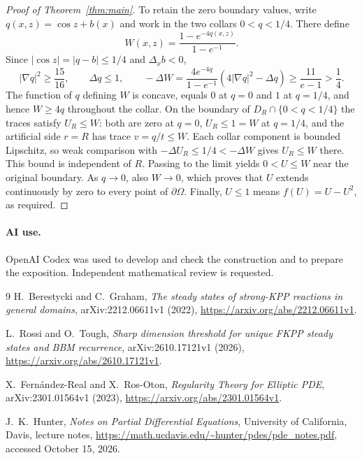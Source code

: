 \documentclass[11pt,a4paper]{article}
\newcommand{\Om}{\Omega}
\begin{document}
\begin{proof}[Proof of Theorem~\ref{thm:main}]
To retain the zero boundary values, write
$q(x,z)=\cos z+b(x)$ and work in the two collars $0<q<1/4$. There define
\[
 W(x,z)=\frac{1-e^{-4q(x,z)}}{1-e^{-1}}.
\]
Since $|\cos z|=|q-b|\le1/4$ and $\Delta_x b<0$,
\[
 |\nabla q|^2\ge\frac{15}{16},\qquad \Delta q\le1,
 \qquad
 -\Delta W
 =\frac{4e^{-4q}}{1-e^{-1}}
   \left(4|\nabla q|^2-\Delta q\right)
 \ge\frac{11}{e-1}>\frac14.
\]
The function of $q$ defining $W$ is concave, equals $0$ at $q=0$ and $1$
at $q=1/4$, and hence $W\ge4q$ throughout the collar. On the boundary of
$D_R\cap\{0<q<1/4\}$ the traces satisfy $U_R\le W$: both are zero at
$q=0$, $U_R\le1=W$ at $q=1/4$, and the artificial side $r=R$ has trace
$v=q/t\le W$. Each collar component is bounded Lipschitz, so weak
comparison with $-\Delta U_R\le1/4<-\Delta W$ gives $U_R\le W$ there.
This bound is independent of $R$. Passing to the limit yields
$0<U\le W$ near the original boundary. As $q\to0$, also $W\to0$,
which proves that $U$ extends continuously by zero to every point of
$\partial\Om$. Finally, $U\le1$ means $f(U)=U-U^2$, as required.
\end{proof}

\paragraph{AI use.}
OpenAI Codex was used to develop and check the construction and to prepare
the exposition. Independent mathematical review is requested.

\begin{thebibliography}{9}
H.~Berestycki and C.~Graham,
\emph{The steady states of strong-KPP reactions in general domains},
arXiv:2212.06611v1 (2022),
\url{https://arxiv.org/abs/2212.06611v1}.

L.~Rossi and O.~Tough,
\emph{Sharp dimension threshold for unique FKPP steady states and BBM recurrence},
arXiv:2610.17121v1 (2026),
\url{https://arxiv.org/abs/2610.17121v1}.

X.~Fern\'andez-Real and X.~Ros-Oton,
\emph{Regularity Theory for Elliptic PDE},
arXiv:2301.01564v1 (2023),
\url{https://arxiv.org/abs/2301.01564v1}.

J.~K.~Hunter,
\emph{Notes on Partial Differential Equations},
University of California, Davis, lecture notes,
\url{https://math.ucdavis.edu/~hunter/pdes/pde_notes.pdf},
accessed October 15, 2026.
\end{thebibliography}
\end{document}
